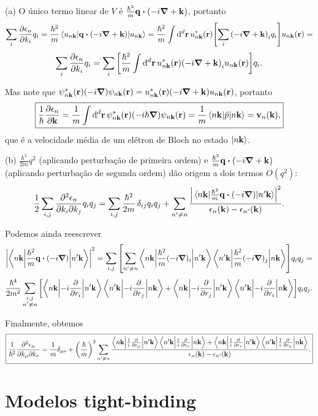 \documentclass[a4paper,10pt]{article}
\begin{document}
\n

(a) O único termo linear de $V$ é $\frac{\hbar^2}{m} \q \vdot (-i\grad + \k)$, portanto
$$
\sum_{i} \pdv{\eps_n}{k_i} q_i = \frac{\hbar^2}{m} \ev{ \q \vdot (-i\grad + \k)}{u_{n\k}} =
\frac{\hbar^2}{m} \int \dd[d]{\r} u_{n\k}^*(\r) \qty[\sum_{i}\qty(-i\grad + \k)_i q_i] u_{n\k}(\r) =
$$
$$
\sum_{i} \pdv{\epsilon_n}{k_i} q_i =\sum_{i} \qty[\frac{\hbar^2}{m} \int \dd[d]{\vb{r}} u_{n\vb{k}}^*(\vb{r}) \qty(-i\grad + \vb{k})_i u_{n\vb{k}}(\vb{r}) ] q_i.
$$

Mas note que $\psi_{n\vb{k}}^*(\vb{r}) \qty(-i\grad) \psi_{n\vb{k}}(\vb{r}) = u_{n\vb{k}}^*(\vb{r}) \qty(-i\grad + \vb{k}) u_{n\vb{k}}(\vb{r})$, portanto
$$
\boxed{\frac{1}{\hbar} \pdv{\eps_n}{\k} = \frac{1}{m} \int \dd[d]{\r} \psi_{n\k}^*(\r) \qty(-i \hbar \grad) \psi_{n\k}(\r) =
\frac{1}{m} \ev{\hat{p}}{n\k} = \v_n(\k),}
$$
que é a velocidade média de um elétron de Bloch no estado $\ket{n\vb{k}}$.

\n

(b) $\frac{\hbar^2}{2m} q^2$ (aplicando perturbação de primeira ordem) e $\frac{\hbar^2}{m} \q \vdot (-i\grad + \k)$ (aplicando perturbação de segunda ordem) dão origem a dois termos $O(q^2)$:
$$
\frac{1}{2} \sum_{i,j} \pdv{\eps_n}{k_i}{k_j} q_i q_j =
\sum_{i,j} \frac{\hbar^2}{2m} \, \delta_{ij} q_i q_j +
\sum_{n' \neq n} \frac{\abs{\mel{n\k}{\frac{\hbar^2}{m} \q \vdot (-i\grad)}{n'\k}}^2}{\eps_n(\k) - \eps_{n'}(\k)}.
$$

Podemos ainda reescrever
$$
\abs{\mel**{n\k}{\frac{\hbar^2}{m} \q \vdot (-i\grad)}{n'\k}}^2 =
\sum_{i,j} \qty[ \sum_{n'\neq n}
\mel**{n\k}{\frac{\hbar^2}{m} (-i\grad)_i}{n'\k} \mel**{n'\k}{\frac{\hbar^2}{m} (-i\grad)_j}{n\k} ] q_i q_j =
$$
$$
\frac{\hbar^4}{2 m^2} \sum_{\substack{i,j \\ n' \neq n}}
\qty[
\mel**{n\vb{k}}{-i\pdv{r_i}}{n'\vb{k}} \mel**{n'\vb{k}}{-i\pdv{r_j}}{n\vb{k}} +
\mel**{n\vb{k}}{-i\pdv{r_j}}{n'\vb{k}} \mel**{n'\vb{k}}{-i\pdv{r_i}}{n\vb{k}}
] q_i q_j.
$$

Finalmente, obtemos
$$
\boxed{\frac{1}{\hbar^2} \pdv{\epsilon_n}{k_\mu}{k_\nu} = \frac{1}{m} \delta_{\mu\nu} + \qty(\frac{\hbar}{m})^2 \sum_{n'\neq n}
\frac{
\mel**{n\vb{k}}{\frac{1}{i}\pdv{r_\mu}}{n'\vb{k}} \mel**{n'\vb{k}}{\frac{1}{i}\pdv{r_\nu}}{n\vb{k}} +
\mel**{n\vb{k}}{\frac{1}{i}\pdv{r_\nu}}{n'\vb{k}} \mel**{n'\vb{k}}{\frac{1}{i}\pdv{r_\mu}}{n\vb{k}}
}{\epsilon_n(\vb{k}) - \epsilon_{n'}(\vb{k})}.}
$$


\pagebreak

\section{Modelos tight-binding}
\end{document}
